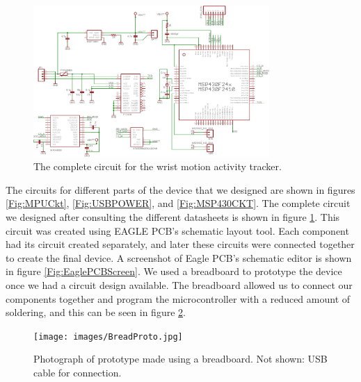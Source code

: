 \begin{figure}
\begin{center}
\includegraphics[angle=-90,width=0.8\textwidth]{images/FULLCKT.eps}
\caption{The complete circuit for the wrist motion activity tracker.}
\label{COMPCKT}
\end{center}
\end{figure}
The circuits for different parts of the device that we designed are shown in figures \ref{Fig:MPUCkt}, \ref{Fig:USBPOWER}, and \ref{Fig:MSP430CKT}.
The complete circuit we designed after consulting the different datasheets is shown in figure \ref{COMPCKT}.
This circuit was created using EAGLE PCB's schematic layout tool.
Each component had its circuit created separately,
and later these circuits were connected together to create the final device.
A screenshot of Eagle PCB's schematic editor is shown in figure \ref{Fig:EaglePCBScreen}.
We used a breadboard to prototype the device once we had a circuit design available.
The breadboard allowed us to connect our components together and program the microcontroller with a reduced amount of soldering, 
and this can be seen in figure \ref{Fig:BreadBoardProto}.

\begin{figure}
\begin{center}
\texttt{[image: images/BreadProto.jpg]}
\caption{Photograph of prototype made using a breadboard. Not shown: USB cable for connection.}
\label{Fig:BreadBoardProto}
\end{center}
\end{figure}


